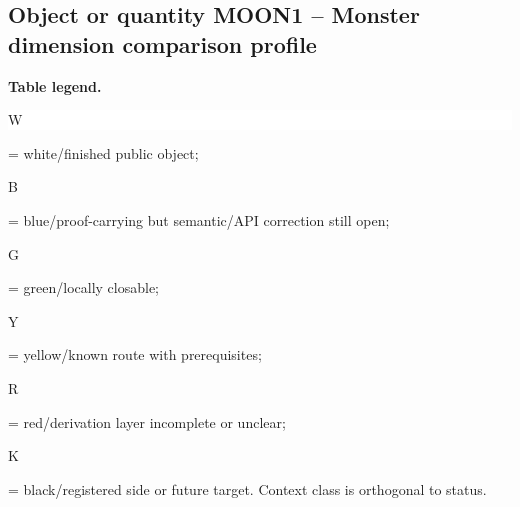 \subsection*{Object or quantity MOON1 -- Monster dimension comparison profile}
\hypertarget{objproof:MOON1}{}
\par\smallskip\noindent\begin{minipage}{0.99\linewidth}\footnotesize\raggedright\textbf{Table legend.} \colorbox{white}{\strut W} = white/finished public object; \colorbox{cyan!20}{\strut B} = blue/proof-carrying but semantic/API correction still open; \colorbox{green!18}{\strut G} = green/locally closable; \colorbox{yellow!25}{\strut Y} = yellow/known route with prerequisites; \colorbox{red!20}{\strut R} = red/derivation layer incomplete or unclear; \colorbox{black!18}{\strut K} = black/registered side or future target. Context class is orthogonal to status.\end{minipage}\par\vspace{0.25em}
